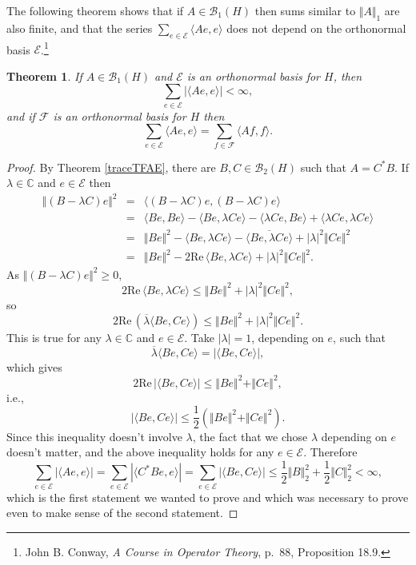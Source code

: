 \documentclass{article}
\newcommand{\inner}[2]{\langle #1, #2 \rangle}
\def\Re{\ensuremath{\mathrm{Re}}\,}
\newcommand{\norm}[1]{\Vert #1 \Vert}
\newtheorem{theorem}{Theorem}
\begin{document}
The following theorem shows that if $A \in \mathscr{B}_1(H)$ then  sums similar to $\norm{A}_1$ are also finite, and
 that the series $\sum_{e \in \mathscr{E}} \inner{Ae}{e}$ does not depend on the orthonormal basis $\mathscr{E}$.\footnote{John 
B. Conway, {\em A Course in Operator Theory}, p.~88, Proposition 18.9.}

\begin{theorem}
If $A \in \mathscr{B}_1(H)$ and $\mathscr{E}$ is an orthonormal basis for $H$, then
\[
\sum_{e \in \mathscr{E}} |\inner{Ae}{e}|< \infty,
\]
and if $\mathscr{F}$ is an orthonormal basis for $H$ then
\[
\sum_{e \in \mathscr{E}} \inner{Ae}{e} = \sum_{f \in \mathscr{F}} \inner{Af}{f}.
\]
\label{absconvergent}
\end{theorem}
\begin{proof}
By Theorem \ref{traceTFAE}, there are $B,C \in \mathscr{B}_2(H)$ such that $A=C^*B$. If $\lambda \in \mathbb{C}$ and $e \in \mathscr{E}$ then
\begin{eqnarray*}
\norm{(B-\lambda C)e}^2 &=& \inner{(B-\lambda C)e}{(B-\lambda C)e}\\
&=&\inner{Be}{Be}-\inner{Be}{\lambda Ce}-\inner{\lambda Ce}{Be}+
\inner{\lambda Ce}{\lambda Ce}\\
&=&\norm{Be}^2-\inner{Be}{\lambda Ce}-\overline{\inner{Be}{\lambda Ce}}+|\lambda|^2 \norm{Ce}^2\\
&=&\norm{Be}^2 - 2 \Re \inner{Be}{\lambda Ce} +|\lambda|^2 \norm{Ce}^2.
\end{eqnarray*}
As $\norm{(B-\lambda C)e}^2 \geq 0$, 
\[
2 \Re \inner{Be}{\lambda Ce} \leq \norm{Be}^2+|\lambda|^2 \norm{Ce}^2,
\]
so
\[
2 \Re\left(\overline{\lambda} \inner{Be}{ Ce}\right) \leq \norm{Be}^2+|\lambda|^2 \norm{Ce}^2.
\]
This is true for any $\lambda \in \mathbb{C}$ and $e \in \mathscr{E}$. Take $|\lambda|=1$, depending on $e$, such that
\[
\overline{\lambda}\inner{Be}{Ce}=|\inner{Be}{Ce}|,
\]
which gives
\[
2\Re |\inner{Be}{Ce}| \leq \norm{Be}^2+\norm{Ce}^2,
\]
i.e.,
\[
|\inner{Be}{Ce}| \leq \frac{1}{2}\left( \norm{Be}^2+\norm{Ce}^2 \right).
\]
Since this inequality doesn't involve $\lambda$, the fact that we chose $\lambda$ depending on $e$ doesn't matter, and the above inequality holds
for any $e \in \mathscr{E}$. Therefore
\[
\sum_{e \in \mathscr{E}} |\inner{Ae}{e}| = \sum_{e \in \mathscr{E}} |\inner{C^*Be}{e}| = \sum_{e \in \mathscr{E}} |\inner{Be}{Ce}|
\leq \frac{1}{2} \norm{B}_2^2 + \frac{1}{2} \norm{C}_2^2 < \infty,
\]
which is the first statement we wanted to prove and which was necessary to prove even to make sense of the second statement.


\end{proof}
\end{document}
